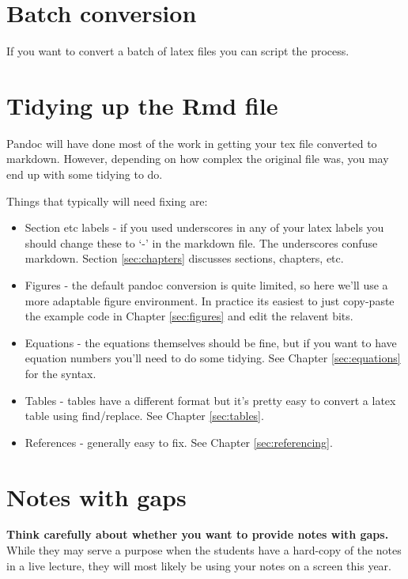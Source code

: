 \documentclass[
]{book}
\providecommand{\tightlist}{%
  \setlength{\itemsep}{0pt}\setlength{\parskip}{0pt}}
\begin{document}
\section{Batch conversion}\label{batch-conversion}

If you want to convert a batch of latex files you can script the process.

\section{Tidying up the Rmd file}\label{tidying}

Pandoc will have done most of the work in getting your tex file converted to markdown. However, depending on how complex the original file was, you may end up with some tidying to do.

Things that typically will need fixing are:

\begin{itemize}
\tightlist
\item
  Section etc labels - if you used underscores in any of your latex labels you should change these to `-' in the markdown file. The underscores confuse markdown. Section \ref{sec:chapters} discusses sections, chapters, etc.
\item
  Figures - the default pandoc conversion is quite limited, so here we'll use a more adaptable figure environment. In practice its easiest to just copy-paste the example code in Chapter \ref{sec:figures} and edit the relavent bits.
\item
  Equations - the equations themselves should be fine, but if you want to have equation numbers you'll need to do some tidying. See Chapter \ref{sec:equations} for the syntax.
\item
  Tables - tables have a different format but it's pretty easy to convert a latex table using find/replace. See Chapter \ref{sec:tables}.
\item
  References - generally easy to fix. See Chapter \ref{sec:referencing}.
\end{itemize}

\section{Notes with gaps}\label{sec:gaps}

\textbf{Think carefully about whether you want to provide notes with gaps.} While they may serve a purpose when the students have a hard-copy of the notes in a live lecture, they will most likely be using your notes on a screen this year.
\end{document}
